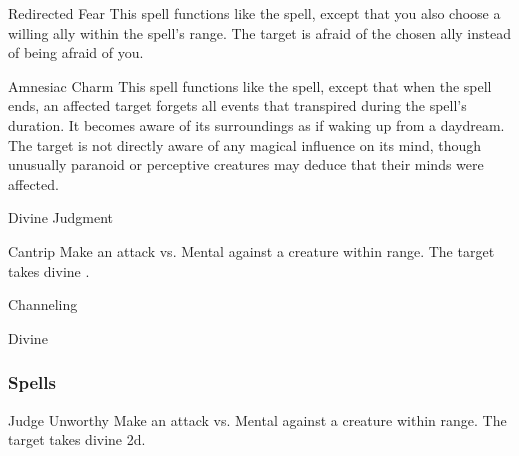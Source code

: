 \lowercase{\hypertarget{spell:Redirected Fear}{}}\label{spell:Redirected Fear}
\begin{ability}[\nth{2}]{\hypertarget{spell:Redirected Fear}{Redirected Fear}}
This spell functions like the  spell, except that you also choose a willing ally within the spell's range.
The target is afraid of the chosen ally instead of being afraid of you.
\end{ability}
\vspace{0.25em}



\lowercase{\hypertarget{spell:Amnesiac Charm}{}}\label{spell:Amnesiac Charm}
\begin{ability}[\nth{5}]{\hypertarget{spell:Amnesiac Charm}{Amnesiac Charm}}
This spell functions like the  spell, except that when the spell ends, an affected target forgets all events that transpired during the spell's duration.
It becomes aware of its surroundings as if waking up from a daydream.
The target is not directly aware of any magical influence on its mind, though unusually paranoid or perceptive creatures may deduce that their minds were affected.
\end{ability}
\vspace{0.25em}


\newpage
\begin{spellsection}{Divine Judgment}

\begin{spellheader}
\end{spellheader}


\begin{ability}{Cantrip}
Make an attack vs. Mental against a creature within \rngmed range.
\hit The target takes divine .
\end{ability}




 Channeling

 Divine
\end{spellsection}


\subsubsection{Spells}


\lowercase{\hypertarget{spell:Judge Unworthy}{}}\label{spell:Judge Unworthy}
\begin{ability}[\nth{1}]{\hypertarget{spell:Judge Unworthy}{Judge Unworthy}}
Make an attack vs. Mental against a creature within \rngmed range.
\hit The target takes divine  \plus2d.
\end{ability}
\vspace{0.25em}



